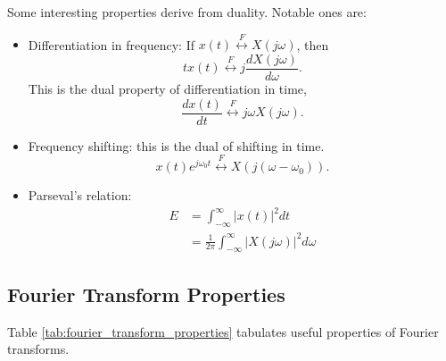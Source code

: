 Some interesting properties derive from duality. Notable ones are:

\begin{itemize}
    \item Differentiation in frequency: If $x(t) \overset{F}{\leftrightarrow} X(j\omega)$, 
    then 
    \begin{equation}
        tx(t)  \overset{F}{\leftrightarrow} j\frac{dX(j\omega)}{d\omega}.
    \end{equation}
    This is the dual property of differentiation in time, 
    \begin{equation}
        \frac{dx(t)}{dt} \overset{F}{\leftrightarrow} j\omega X(j\omega).
    \end{equation}
    \item Frequency shifting: this is the dual of shifting in time. 
    \begin{equation}
        x(t)e^{j\omega_0 t} \overset{F}{\leftrightarrow} X(j(\omega-\omega_0)).
    \end{equation}
    \item Parseval's relation: 
    \begin{align}
        E &= \int_{-\infty}^{\infty} |x(t)|^2 dt \\
        &= \frac{1}{2\pi} \int_{-\infty}^{\infty} |X(j\omega)|^2 d\omega
    \end{align}
\end{itemize}

\subsection{Fourier Transform Properties}

Table \ref{tab:fourier_transform_properties} tabulates
useful properties of Fourier transforms.

